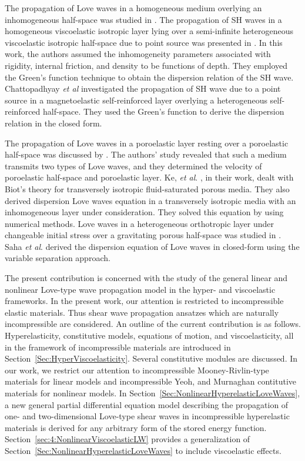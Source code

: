 \documentclass[11pt,letter,subeqn,fleqn]{article}
\numberwithin{equation}{section}
\numberwithin{table}{section}
\numberwithin{figure}{section}
\begin{document}
The propagation of Love waves in a homogeneous medium overlying an inhomogeneous half-space was studied in \cite{gupta2013propagation}. The propagation of SH waves in a homogeneous viscoelastic isotropic layer lying over a semi-infinite heterogeneous viscoelastic isotropic half-space due to point source was presented in \cite{chattopadhyay2012effect}. In this work, the authors assumed the inhomogeneity parameters associated with rigidity, internal friction, and density to be functions of depth. They employed the Green's function technique to obtain the dispersion relation of the SH wave. Chattopadhyay \textit{et al} \cite{chattopadhyay2011effect} investigated the propagation of SH wave due to a point source in a magnetoelastic self-reinforced layer overlying a heterogeneous self-reinforced half-space. They used the Green's function to derive the dispersion relation in the closed form.


The propagation of Love waves in a poroelastic layer resting over a poroelastic half-space was discussed by \cite{dey2004propagation}. The authors' study revealed that such a medium transmits two types of Love waves, and they determined the velocity of poroelastic half-space and poroelastic layer. Ke, \textit{et al}. \cite{ke2006love}, in their work, dealt with Biot's theory for transversely isotropic fluid-saturated porous media.  They also derived dispersion Love waves equation in a transversely isotropic media with an inhomogeneous layer under consideration. They solved this equation by using numerical methods. Love waves in a heterogeneous orthotropic layer under changeable initial stress over a gravitating porous half-space was studied in \cite{saha2015love}.  Saha \textit{et al}. \cite{saha2015love} derived the dispersion equation of Love waves in closed-form using the variable separation approach.

\medskip
The present contribution is concerned with the study of the general linear and nonlinear Love-type wave propagation model in the hyper- and viscoelastic frameworks. In the present work, our attention is restricted to incompressible elastic materials. Thus shear wave propagation ansatzes which are naturally incompressible are considered. An outline of the current contribution is as follows. Hyperelasticity, constitutive models, equations of motion, and viscoelasticity, all in the framework of incompressible materials are introduced in Section~\ref{Sec:HyperViscoelasticity}. Several constitutive modules are discussed. In our work, we restrict our attention to incompressible  Mooney-Rivlin-type materials for linear models and incompressible Yeoh, and Murnaghan contitutive materials for nonlinear models. In Section~\ref{Sec:NonlinearHyperelasticLoveWaves}, a new general partial differential equation model describing the propagation of one- and two-dimensional Love-type shear waves in incompressible hyperelastic materials is derived for any arbitrary form of the stored energy function. Section~\ref{sec:4:NonlinearViscoelasticLW} provides a generalization of Section~\ref{Sec:NonlinearHyperelasticLoveWaves} to include viscoelastic effects.
\end{document}
